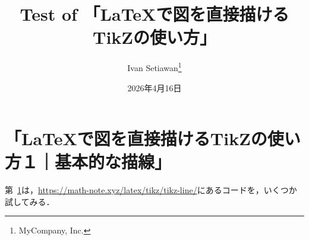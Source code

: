 \documentclass[uplatex,dvipdfmx]{jlreq}
\title{\huge{Test of 「\LaTeX{}で図を直接描けるTikZの使い方」}}
\author{Ivan Setiawan\thanks{MyCompany, Inc.}}
\date{2026年4月16日}
\begin{document}
\maketitle

\section{「\LaTeX{}で図を直接描けるTikZの使い方１｜基本的な描線」}
\label{linebasic}

第~\ref{linebasic}は，\url{https://math-note.xyz/latex/tikz/tikz-line/}にあるコードを，いくつか試してみる．
\end{document}
